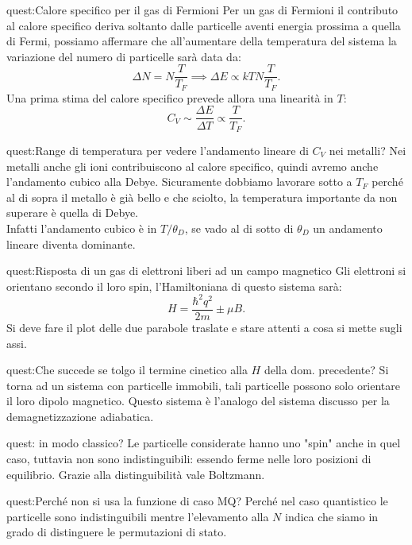 \begin{quest}{quest:Calore specifico per il gas di Fermioni}
Per un gas di Fermioni il contributo al calore specifico deriva soltanto dalle particelle aventi energia prossima a quella di Fermi, possiamo affermare che all'aumentare della temperatura del sistema la variazione del numero di particelle sarà data da: 
\[
    \Delta  N = N \frac{T}{T_F} \implies
    \Delta E \propto   kT N \frac{T}{T_F}
.\] 
Una prima stima del calore specifico prevede allora una linearità in $T$: 
\[
    C_V \sim \frac{\Delta E}{\Delta T} \propto  \frac{T}{T_F}
.\]
\end{quest}
\begin{quest}{quest:Range di temperatura per vedere l'andamento lineare di $C_V$ nei metalli?}
Nei metalli anche gli ioni contribuiscono al calore specifico, quindi avremo anche l'andamento cubico alla Debye. Sicuramente dobbiamo lavorare sotto a $T_F$ perché al di sopra il metallo è già bello e che sciolto, la temperatura importante da non superare è quella di Debye.\\
Infatti l'andamento cubico è in $T /\theta_D$, se vado al di sotto di $\theta_D$ un andamento lineare diventa dominante.
\end{quest}
\begin{quest}{quest:Risposta di un gas di elettroni liberi ad un campo magnetico}
Gli elettroni si orientano secondo il loro spin, l'Hamiltoniana di questo sistema sarà:
\[
    H = \frac{\hbar ^2q^2}{2m}\pm \mu B
.\] 
Si deve fare il plot delle due parabole traslate e stare attenti a cosa si mette sugli assi.
\end{quest}
\begin{quest}{quest:Che succede se tolgo il termine cinetico alla $H$ della dom. precedente?}
Si torna ad un sistema con particelle immobili, tali particelle possono solo orientare il loro dipolo magnetico. Questo sistema è l'analogo del sistema discusso per la demagnetizzazione adiabatica.
\end{quest}
\begin{quest}{quest: in modo classico?}
Le particelle considerate hanno uno "spin" anche in quel caso, tuttavia non sono indistinguibili: essendo ferme nelle loro posizioni di equilibrio. Grazie alla distinguibilità vale Boltzmann.\\
\end{quest}
\begin{quest}{quest:Perché non si usa la funzione di caso MQ?}
Perché nel caso quantistico le particelle sono indistinguibili mentre l'elevamento alla $N$ indica che siamo in grado di distinguere le permutazioni di stato.
\end{quest}


